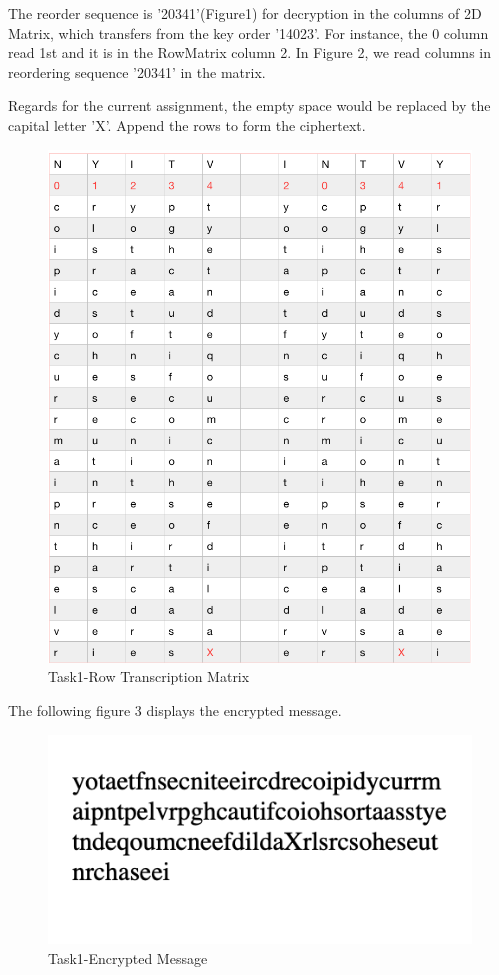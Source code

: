 \documentclass[twoside,twocolumn]{article}
\begin{document}
The reorder sequence is '20341'(Figure1) for decryption in the columns of 2D Matrix, which transfers from the key order '14023'. For instance, the 0 column read 1st and it is in the RowMatrix column 2. In Figure 2, we read columns in reordering sequence '20341' in the matrix.


Regards for the current assignment, the empty space would be replaced by the capital letter 'X'.  Append the rows to form the ciphertext.\\

\begin{figure}[H]
  \centering
  \includegraphics[scale=0.4]{./Graphs/Figure1.2.png}
  \caption{Task1-Row Transcription Matrix}
  \label{fig:testfig1}
\end{figure}


The following figure 3 displays the encrypted message.

\begin{figure}[H]
  \centering
  \includegraphics[scale=0.75]{./Graphs/Figure1.4.png}
  \caption{Task1-Encrypted Message}
  \label{fig:testfig1}
\end{figure}
\end{document}
